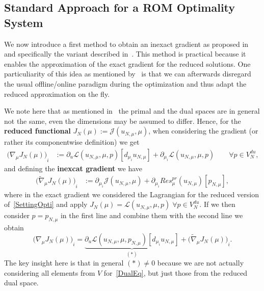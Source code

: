 \subsection{Standard Approach for a ROM Optimality System}

We now introduce a first method to obtain an inexact gradient as proposed in~\cite{Qian2017} and specifically the variant described in~\cite[Subsection 3.2]{Keil2021}.
This method is practical because it enables the approximation of the exact gradient for the reduced solutions.
One particuliarity of this idea as mentioned by~\cite{Qian2017} is that we can afterwards disregard the usual offline/online paradigm during the optimization and thus adapt the reduced approximation on the fly.

We note here that as mentioned in~\cite[Subsection 3.2]{Keil2021} the primal and the dual spaces are in general not the same, even the dimensions may be assumed to differ.
Hence, for the \textbf{reduced functional} $J_N(\mu) := \mathcal{J}(u_{N, \mu}, \mu)$, when considering the gradient (or rather its componentwise definition) we get
\begin{align}\label{Grad}
    {\big( \nabla_\mu J_N(\mu) \big)}_i &:= \partial_u \mathcal{L}(u_{N, \mu}, \mu, p)[d_{\mu_i} u_{N, \mu}] + \partial_{\mu_i} \mathcal{L}(u_{N, \mu}, \mu, p) \qquad \forall p \in V_N^{du}, \tag*{(exact)}
\end{align}
and defining the \textbf{inexcat gradient} we have
\begin{align}
    {\big( \tilde{\nabla}_\mu J_N(\mu) \big)}_i &:= \partial_{\mu_i} \mathcal{J}(u_{N, \mu}, \mu) + \partial_{\mu_i} Res_\mu^{pr}(u_{N, \mu})[p_{N, \mu}], \tag*{(inexact)}
\end{align}
where in the exact gradient we considered the Lagrangian for the reduced version of~\eqref{SettingOpti} and apply $J_N(\mu) = \mathcal{L}(u_{N, \mu}, \mu, p) \; \forall p \in V_N^{du}$.
If we then consider $p = p_{N, \mu}$ in the first line and combine them with the second line we obtain
\begin{equation*}\label{RelationGrads}
    {\big( \nabla_\mu J_N(\mu) \big)}_i = \underbrace{\partial_u \mathcal{L}(u_{N, \mu}, \mu, p_{N, \mu})[d_{\mu_i} u_{N, \mu}]}_{(\ast)} + {\big( \tilde{\nabla}_\mu J_N(\mu) \big)}_i.
\end{equation*}
The key insight here is that in general $(\ast) \neq 0$ because we are not actually considering all elements from $V$ for~\eqref{DualEq}, but just those from the reduced dual space.

